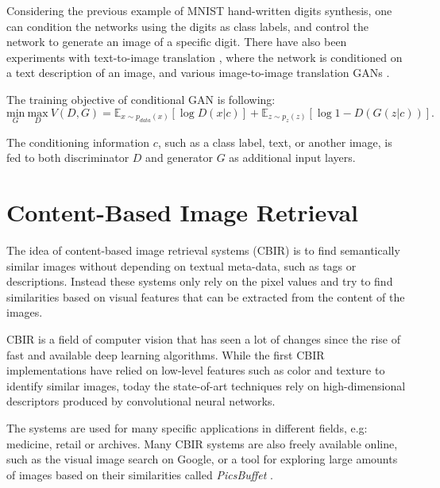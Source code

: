 \documentclass[12pt]{report}
\begin{document}
Considering the previous example of MNIST hand-written digits synthesis, one can condition the networks using the digits as class labels, and control the network to generate an image of a specific digit. There have also been experiments with text-to-image translation \cite{reed_generative_2016}, where the network is conditioned on a text description of an image, and various image-to-image translation GANs \cite{yoo_pixel-level_2016}\cite{yoo_pixel-level_2016}\cite{pathak_context_2016}.

The training objective of conditional GAN is following:
\begin{equation}
\underset{G}{\mathrm{min}} \ \underset{D}{\mathrm{max}} \ V(D,G) = \mathbb{E}_{x \sim p_{data}(x)}[\log D(x|c)] + \mathbb{E}_{z \sim p_{z}(z)}[\log 1 - D(G(z|c))].
\label{eq:cgan}
\end{equation}

The conditioning information $c$, such as a class label, text, or another image, is fed to both discriminator $D$ and generator $G$ as additional input layers.









\pagebreak
\section{Content-Based Image Retrieval}
The idea of content-based image retrieval systems (CBIR) is to find semantically similar images without depending on textual meta-data, such as tags or descriptions. Instead these systems only rely on the pixel values and try to find similarities based on visual features that can be extracted from the content of the images.

CBIR is a field of computer vision that has seen a lot of changes since the rise of fast and available deep learning algorithms. While the first CBIR implementations have relied on low-level features such as color and texture to identify similar images, today the state-of-art techniques rely on high-dimensional descriptors produced by convolutional neural networks.

The systems are used for many specific applications in different fields, e.g: medicine, retail or archives. Many CBIR systems are also freely available online, such as the visual image search on Google, or a tool for exploring large amounts of images based on their similarities called \textit{PicsBuffet} \cite{mackowiak_picsbuffet_nodate}.
\end{document}
